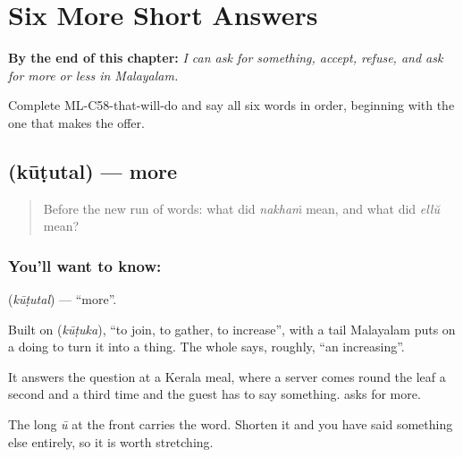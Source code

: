 
\chapter{Six More Short Answers}
\label{ch:ml-five-more-short-answers}

\begin{chapteropening}
\textbf{By the end of this chapter:} \emph{I can ask for something, accept, refuse, and ask for more or less in Malayalam.}

Complete ML-C58-that-will-do and say all six words in order, beginning with the one that makes the offer.
\end{chapteropening}

\section[\texorpdfstring{\ml{കൂടുതൽ} (kūṭutal)}{കൂടുതൽ (kūṭutal)}]{ (kūṭutal) — more}

\label{lesson:ML-C58-more}



\begin{quote}
Before the new run of words: what did \emph{nakhaṁ} mean, and what did \emph{ellŭ} mean?
\end{quote}

\subsection*{You'll want to know: }
\textbf{} (\emph{kūṭutal}) — \textquotedblleft{}more\textquotedblright{}.

Built on  (\emph{kūṭuka}), \textquotedblleft{}to join, to gather, to increase\textquotedblright{}, with a tail Malayalam puts on a doing to turn it into a thing. The whole says, roughly, \textquotedblleft{}an increasing\textquotedblright{}.

It answers the question at a Kerala meal, where a server comes round the leaf a second and a third time and the guest has to say something.  asks for more.

The long \emph{ū} at the front carries the word. Shorten it and you have said something else entirely, so it is worth stretching.

